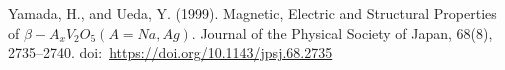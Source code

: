 \documentclass[11pt]{article}
\begin{document}
\begin{thebibliography}{3}
Yamada, H., and Ueda, Y. (1999). Magnetic, Electric and Structural Properties of $\beta-A_xV_2O_5(A=Na, Ag)$. Journal of the Physical Society of Japan, 68(8), 2735–2740. doi:~\url{https://doi.org/10.1143/jpsj.68.2735}                                                                                                                                                                                                                                                                                                                                                                                                                                                                                                                                                                                                                                                                                                                                                                                                                                                                                                                                                                                                                                                                                                                                                                                                                                                                                                                                                                                                                                                                                                                                                                                                                                                                                                                                                                                                                                                                                                                                                                                                                                                                                                                                                                                                                                                                                                                                                                                                                                                                                                                                                                                                                                                                                                                                                                                                                                                                                                                                                                                                                                                                                                                                                                                               
\end{thebibliography}
\end{document}
